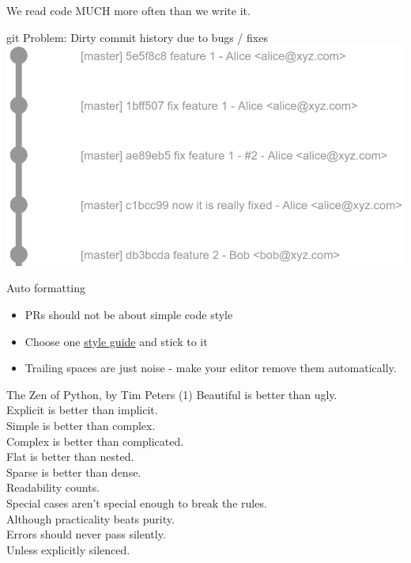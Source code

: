 \documentclass{beamer}
\begin{document}
\begin{frame}{}
     \huge We read code MUCH more often than we write it.
\end{frame}

\begin{frame}{git}
    Problem: Dirty commit history due to bugs / fixes
    \includegraphics[width=1.0\textwidth]{graphics/git-2-fixes.png}
\end{frame}

\begin{frame}{Auto formatting}
    \begin{itemize}[<+->]
        \item PRs should not be about simple code style
        \item Choose one \href{https://martin-thoma.com/python-style-guide/}{style guide}
              and stick to it
        \item Trailing spaces are just noise - make your editor remove them
              automatically.
    \end{itemize}
\end{frame}

\begin{frame}{The Zen of Python, by Tim Peters (1)}
Beautiful is better than ugly.\\
Explicit is better than implicit.\\
Simple is better than complex.\\
Complex is better than complicated.\\
Flat is better than nested.\\
Sparse is better than dense.\\
Readability counts.\\
Special cases aren't special enough to break the rules.\\
Although practicality beats purity.\\
Errors should never pass silently.\\
Unless explicitly silenced.
\end{frame}
\end{document}
